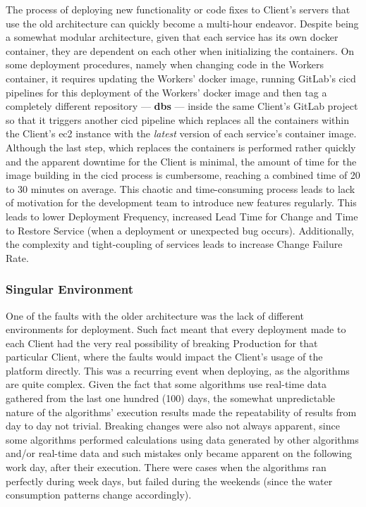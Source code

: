 The process of deploying new functionality or code fixes to Client's servers that use the old architecture can quickly become a multi-hour endeavor. Despite being a somewhat modular architecture, given that each service has its own docker container, they are dependent on each other when initializing the containers. On some deployment procedures, namely when changing code in the Workers container, it requires updating the Workers' docker image, running GitLab's \gls{cicd} pipelines for this deployment of the Workers' docker image and then tag a completely different repository —  \textbf{dbs} — inside the same Client's GitLab project so that it triggers another \gls{cicd} pipeline which replaces all the containers within the Client's \gls{ec2} instance with the \textit{latest} version of each service's container image. Although the last step, which replaces the containers is performed rather quickly and the apparent downtime for the Client is minimal, the amount of time for the image building in the \gls{cicd} process is cumbersome, reaching a combined time of 20 to 30 minutes on average. This chaotic and time-consuming process leads to lack of motivation for the development team to introduce new features regularly. This leads to lower Deployment Frequency, increased Lead Time for Change and Time to Restore Service (when a deployment or unexpected bug occurs). Additionally, the complexity and tight-coupling of services leads to increase Change Failure Rate. 

\subsubsection{Singular Environment}\label{methodology:sss:singular-environment}

One of the faults with the older architecture was the lack of different environments for deployment. Such fact meant that every deployment made to each Client had the very real possibility of breaking Production for that particular Client, where the faults would impact the Client's usage of the platform directly. This was a recurring event when deploying, as the algorithms are quite complex. Given the fact that some algorithms use real-time data gathered from the last one hundred (100) days, the somewhat unpredictable nature of the algorithms' execution results made the repeatability of results from day to day not trivial.
Breaking changes were also not always apparent, since some algorithms performed calculations using data generated by other algorithms and/or real-time data and such mistakes only became apparent on the following work day, after their execution. There were cases when the algorithms ran perfectly during week days, but failed during the weekends (since the water consumption patterns change accordingly).

